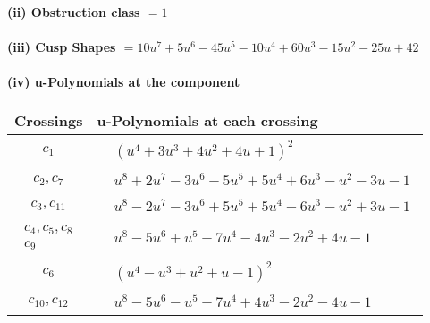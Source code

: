 \documentclass[1p]{elsarticle_modified}
\theoremstyle{definition}
\begin{document}
\flushleft \textbf{(ii) Obstruction class $= 1$}\\~\\
\flushleft \textbf{(iii) Cusp Shapes $= 10 u^7+5 u^6-45 u^5-10 u^4+60 u^3-15 u^2-25 u+42$}\\~\\
\newpage\renewcommand{\arraystretch}{1}
\flushleft \textbf{(iv) u-Polynomials at the component}\newline \\
\begin{tabular}{m{50pt}|m{274pt}}
Crossings & \hspace{64pt}u-Polynomials at each crossing \\
\hline $$\begin{aligned}c_{1}\end{aligned}$$&$\begin{aligned}
&(u^4+3 u^3+4 u^2+4 u+1)^2
\end{aligned}$\\
\hline $$\begin{aligned}c_{2},c_{7}\end{aligned}$$&$\begin{aligned}
&u^8+2 u^7-3 u^6-5 u^5+5 u^4+6 u^3- u^2-3 u-1
\end{aligned}$\\
\hline $$\begin{aligned}c_{3},c_{11}\end{aligned}$$&$\begin{aligned}
&u^8-2 u^7-3 u^6+5 u^5+5 u^4-6 u^3- u^2+3 u-1
\end{aligned}$\\
\hline $$\begin{aligned}c_{4},c_{5},c_{8}\\c_{9}\end{aligned}$$&$\begin{aligned}
&u^8-5 u^6+u^5+7 u^4-4 u^3-2 u^2+4 u-1
\end{aligned}$\\
\hline $$\begin{aligned}c_{6}\end{aligned}$$&$\begin{aligned}
&(u^4- u^3+u^2+u-1)^2
\end{aligned}$\\
\hline $$\begin{aligned}c_{10},c_{12}\end{aligned}$$&$\begin{aligned}
&u^8-5 u^6- u^5+7 u^4+4 u^3-2 u^2-4 u-1
\end{aligned}$\\
\hline
\end{tabular}\\~\\
\end{document}
